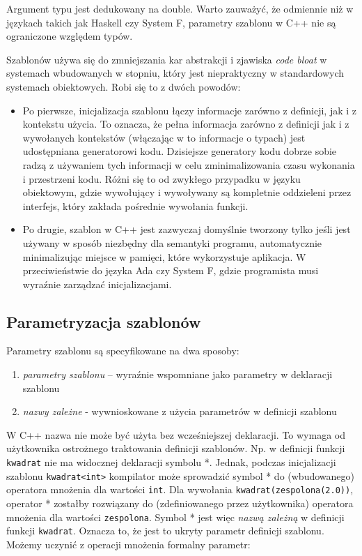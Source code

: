 \documentclass[11pt, a4paper]{article}
\begin{document}
Argument typu jest dedukowany na double. Warto zauważyć, że odmiennie niż w językach takich jak Haskell czy System F, parametry szablonu w C++ nie są ograniczone względem typów.

Szablonów używa się do zmniejszania kar abstrakcji i zjawiska \emph{code bloat} w systemach wbudowanych w stopniu, który jest niepraktyczny w standardowych systemach obiektowych. Robi się to z dwóch powodów:

\begin{itemize}

\item Po pierwsze, inicjalizacja szablonu łączy informacje zarówno z definicji, jak i z kontekstu użycia. To oznacza, że pełna informacja zarówno z definicji jak i z wywołanych kontekstów (włączając w to informacje o typach) jest udostępniana generatorowi kodu. Dzisiejsze generatory kodu dobrze sobie radzą z używaniem tych informacji w celu zminimalizowania czasu wykonania i przestrzeni kodu. Różni się to od zwykłego przypadku w języku obiektowym, gdzie wywołujący i wywoływany są kompletnie oddzieleni przez interfejs, który zakłada pośrednie wywołania funkcji.

\item Po drugie, szablon w C++ jest zazwyczaj domyślnie tworzony tylko jeśli jest używany w sposób niezbędny dla semantyki programu, automatycznie minimalizując miejsce w pamięci, które wykorzystuje aplikacja. W przeciwieństwie do języka Ada czy System F, gdzie programista musi wyraźnie zarządzać inicjalizacjami.

\end{itemize}

\subsection{Parametryzacja szablonów}

Parametry szablonu są specyfikowane na dwa sposoby:

\begin{enumerate}

\item \emph{parametry szablonu} – wyraźnie wspomniane jako parametry w deklaracji szablonu

\item \emph{nazwy zależne} - wywnioskowane z użycia parametrów w definicji szablonu

\end{enumerate}

W C++ nazwa nie może być użyta bez wcześniejszej deklaracji. To wymaga od użytkownika ostrożnego traktowania definicji szablonów. Np. w definicji funkcji \verb#kwadrat# nie ma widocznej deklaracji symbolu *. Jednak, podczas inicjalizacji szablonu \verb#kwadrat<int># kompilator może sprowadzić symbol * do (wbudowanego) operatora mnożenia dla wartości \verb#int#. Dla wywołania \verb#kwadrat(zespolona(2.0))#, operator * zostałby rozwiązany do (zdefiniowanego przez użytkownika) operatora mnożenia dla wartości \verb#zespolona#. Symbol * jest więc \emph{nazwą zależną} w definicji funkcji \verb#kwadrat#. Oznacza to, że jest to ukryty parametr definicji szablonu. Możemy uczynić z operacji mnożenia formalny parametr:
\end{document}
